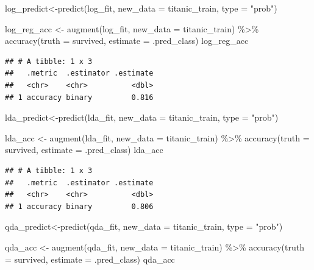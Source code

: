 \documentclass[
]{article}
\newenvironment{Shaded}{\begin{snugshade}}{\end{snugshade}}
\newcommand{\AttributeTok}[1]{\textcolor[rgb]{0.77,0.63,0.00}{#1}}
\newcommand{\FunctionTok}[1]{\textcolor[rgb]{0.00,0.00,0.00}{#1}}
\newcommand{\NormalTok}[1]{#1}
\newcommand{\OtherTok}[1]{\textcolor[rgb]{0.56,0.35,0.01}{#1}}
\newcommand{\SpecialCharTok}[1]{\textcolor[rgb]{0.00,0.00,0.00}{#1}}
\newcommand{\StringTok}[1]{\textcolor[rgb]{0.31,0.60,0.02}{#1}}
\begin{document}
\begin{Shaded}
\begin{Highlighting}[]
\NormalTok{log\_predict}\OtherTok{\textless{}{-}}\FunctionTok{predict}\NormalTok{(log\_fit, }\AttributeTok{new\_data =}\NormalTok{ titanic\_train, }\AttributeTok{type =} \StringTok{"prob"}\NormalTok{)}

\NormalTok{log\_reg\_acc }\OtherTok{\textless{}{-}} \FunctionTok{augment}\NormalTok{(log\_fit, }\AttributeTok{new\_data =}\NormalTok{ titanic\_train) }\SpecialCharTok{\%\textgreater{}\%}
  \FunctionTok{accuracy}\NormalTok{(}\AttributeTok{truth =}\NormalTok{ survived, }\AttributeTok{estimate =}\NormalTok{ .pred\_class)}
\NormalTok{log\_reg\_acc}
\end{Highlighting}
\end{Shaded}

\begin{verbatim}
## # A tibble: 1 x 3
##   .metric  .estimator .estimate
##   <chr>    <chr>          <dbl>
## 1 accuracy binary         0.816
\end{verbatim}

\begin{Shaded}
\begin{Highlighting}[]
\NormalTok{lda\_predict}\OtherTok{\textless{}{-}}\FunctionTok{predict}\NormalTok{(lda\_fit, }\AttributeTok{new\_data =}\NormalTok{ titanic\_train, }\AttributeTok{type =} \StringTok{"prob"}\NormalTok{)}

\NormalTok{lda\_acc }\OtherTok{\textless{}{-}} \FunctionTok{augment}\NormalTok{(lda\_fit, }\AttributeTok{new\_data =}\NormalTok{ titanic\_train) }\SpecialCharTok{\%\textgreater{}\%}
  \FunctionTok{accuracy}\NormalTok{(}\AttributeTok{truth =}\NormalTok{ survived, }\AttributeTok{estimate =}\NormalTok{ .pred\_class)}
\NormalTok{lda\_acc}
\end{Highlighting}
\end{Shaded}

\begin{verbatim}
## # A tibble: 1 x 3
##   .metric  .estimator .estimate
##   <chr>    <chr>          <dbl>
## 1 accuracy binary         0.806
\end{verbatim}

\begin{Shaded}
\begin{Highlighting}[]
\NormalTok{qda\_predict}\OtherTok{\textless{}{-}}\FunctionTok{predict}\NormalTok{(qda\_fit, }\AttributeTok{new\_data =}\NormalTok{ titanic\_train, }\AttributeTok{type =} \StringTok{"prob"}\NormalTok{)}

\NormalTok{qda\_acc }\OtherTok{\textless{}{-}} \FunctionTok{augment}\NormalTok{(qda\_fit, }\AttributeTok{new\_data =}\NormalTok{ titanic\_train) }\SpecialCharTok{\%\textgreater{}\%}
  \FunctionTok{accuracy}\NormalTok{(}\AttributeTok{truth =}\NormalTok{ survived, }\AttributeTok{estimate =}\NormalTok{ .pred\_class)}
\NormalTok{qda\_acc}
\end{Highlighting}
\end{Shaded}
\end{document}
